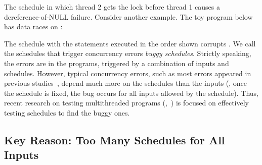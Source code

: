 \hspace{2in}
\begin{minipage}{0.5\columnwidth}
\end{minipage}
\vspace{0.2in}

\noindent The schedule in which thread 2
gets the lock before thread 1 causes a dereference-of-NULL failure.  Consider
another example.  The toy program below has data races on :

\hspace{1.5in}
\begin{minipage}{0.5\columnwidth}
\end{minipage}

\noindent The schedule with the statements
executed in the order shown corrupts . We call the schedules that
trigger concurrency errors \emph{buggy schedules}.  Strictly speaking, the
errors are in the programs, triggered by a combination of inputs and schedules. 
However, typical concurrency errors, such as most errors appeared in previous
studies~\cite{lu:concurrency-bugs,con:hotpar12}, depend much more on the
schedules than the inputs (\eg, once the schedule is fixed, the bug
occurs for all inputs allowed by the schedule).  Thus, recent research on
testing multithreaded programs (\eg,~\cite{musuvathi:chess:osdi08}) is
focused on effectively testing schedules to find the buggy ones.

\subsection{Key Reason: Too Many Schedules for All Inputs}

